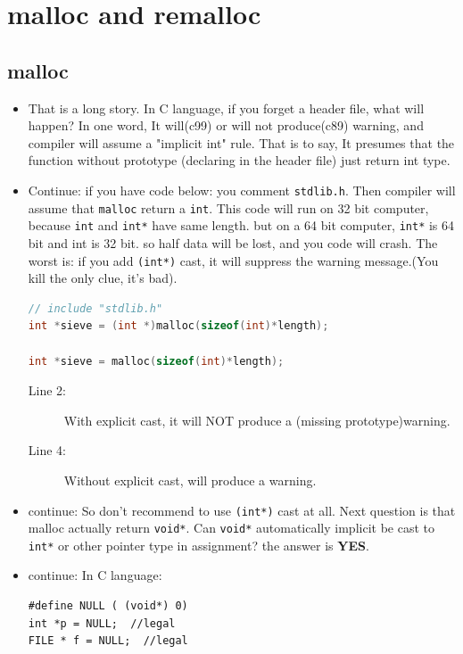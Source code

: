 \documentclass[a4paper,11pt,twoside]{book}
\begin{document}
\section{malloc and remalloc}
\subsection{malloc}
\begin{itemize}
	\item That is a long story. In C language, if you forget a header file, what will happen? In one word, It will(c99) or will not produce(c89) warning, and compiler will assume a "implicit int" rule. That is to say, It presumes that the function without prototype (declaring in the header file) just return int type.
	
	\item Continue: if you have code below: you comment \texttt{stdlib.h}. Then compiler will assume that \texttt{malloc} return a \texttt{int}.  This code will run on 32 bit computer, because \texttt{int} and \texttt{int*} have same length. but on a 64 bit computer, \texttt{int*} is 64 bit and int is 32 bit.  so half data will be lost, and you code will crash. The worst is: if you add \texttt{(int*)} cast, it will suppress the warning message.(You kill the only clue, it's bad).
\begin{lstlisting}[frame=single, language=c++]
// include "stdlib.h"
int *sieve = (int *)malloc(sizeof(int)*length);
	
int *sieve = malloc(sizeof(int)*length);
\end{lstlisting}
\begin{description}
	\item[Line 2:] With explicit cast, it will NOT produce a (missing prototype)warning.
	\item[Line 4:] Without explicit cast, will produce a warning.
\end{description}

	\item continue: So don't recommend to use \texttt{(int*)} cast at all. Next question is that malloc actually return \texttt{void*}. Can \texttt{void*} automatically implicit be cast to \texttt{int*} or other pointer type in assignment? the answer is \textbf{YES}.
	
	\item  continue: In C language:
\begin{lstlisting}[numbers=none]
#define NULL ( (void*) 0)
int *p = NULL;  //legal
FILE * f = NULL;  //legal
\end{lstlisting}
	

\end{itemize}
\end{document}
